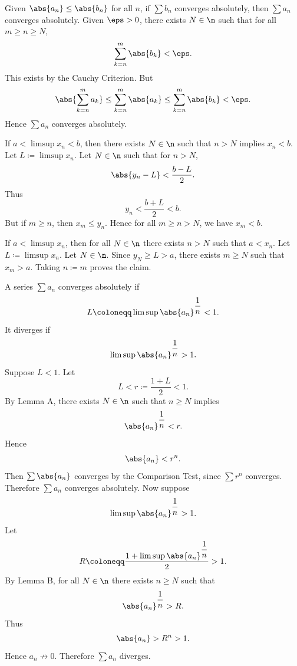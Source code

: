 

\begin{theorem}{
    Given $\abs{a_n}\leq\abs{b_n}$ for all $n$, if $\sum b_n$ converges absolutely, then $\sum a_n$ converges absolutely.
}
    Given $\eps > 0$, there exists $N\in\n$ such that for all $m\geq n\geq N$,
    \[
        \sum_{k=n}^m \abs{b_k} < \eps.
    \]
    This exists by the Cauchy Criterion.
    But
    \[
        \abs{\sum_{k=n}^m a_k}\leq \sum_{k=n}^m\abs{a_k}\leq \sum_{k=n}^m\abs{b_k} < \eps.
    \]
    Hence $\sum a_n$ converges absolutely.
\end{theorem}

\begin{lemma}[Lemma A]{
    If $a < \limsup x_n < b$, then there exists $N\in\n$ such that $n > N$ implies $x_n < b$.
}
    Let $L \coloneqq \limsup x_n$.
    Let $N\in\n$ such that for $n > N$,
    \[
        \abs{y_n - L} < \dfrac{b-L}{2}.
    \]
    Thus
    \[
        y_n < \dfrac{b + L}{2} < b.
    \]
    But if $m\geq n$, then $x_m\leq y_n$.
    Hence for all $m\geq n > N$, we have $x_m < b$.
\end{lemma}

\begin{lemma}[Lemma B]{
    If $a < \limsup x_n$, then for all $N\in\n$ there exists $n > N$ such that $a < x_n$.
}
    Let $L \coloneqq \limsup x_n$.
    Let $N\in\n$.
    Since $y_N \geq L > a$, there exists $m\geq N$ such that $x_m > a$.
    Taking $n \coloneqq m$ proves the claim.
\end{lemma}

\begin{theorem}{
    A series $\sum a_n$ converges absolutely if
    \[
        L \coloneqq \limsup \abs{a_n}^{\dfrac{1}{n}} < 1.
    \]
    It diverges if
    \[
        \limsup \abs{a_n}^{\dfrac{1}{n}} > 1.
    \]
}
    Suppose $L < 1$.
    Let
    \[
        L < r \coloneqq \dfrac{1 + L}{2} < 1.
    \]
    By Lemma A, there exists $N\in\n$ such that $n\geq N$ implies
    \[
        \abs{a_n}^{\dfrac{1}{n}} < r.
    \]
    Hence
    \[
        \abs{a_n} < r^n.
    \]
    Then $\sum \abs{a_n}$ converges by the Comparison Test, since $\sum r^n$ converges.
    Therefore $\sum a_n$ converges absolutely.
    Now suppose
    \[
        \limsup \abs{a_n}^{\dfrac{1}{n}} > 1.
    \]
    Let
    \[
        R \coloneqq \dfrac{1 + \limsup \abs{a_n}^{\dfrac{1}{n}}}{2} > 1.
    \]
    By Lemma B, for all $N\in\n$ there exists $n\geq N$ such that
    \[
        \abs{a_n}^{\dfrac{1}{n}} > R.
    \]
    Thus
    \[
        \abs{a_n} > R^n > 1.
    \]
    Hence $a_n\not\to 0$.
    Therefore $\sum a_n$ diverges.
\end{theorem}

